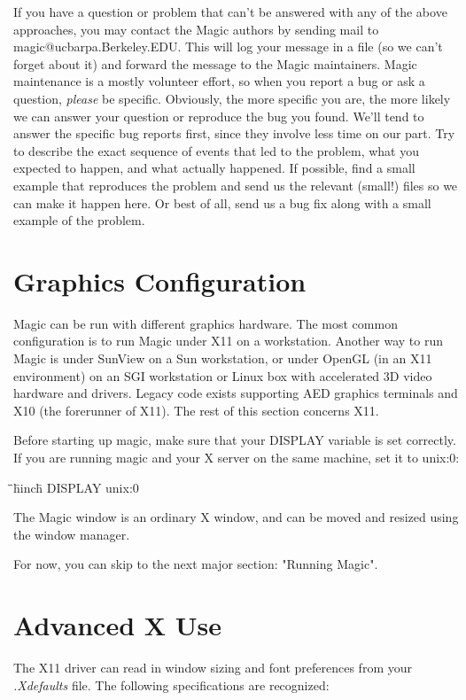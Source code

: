\documentclass[letterpaper,twoside,12pt]{article}
\def\hinch{\hspace*{0.5in}}
\def\starti{\begin{center}\begin{tabbing}\hinch\=\hinch\=\hinch\=hinch\hinch\=\kill}
\def\endi{\end{tabbing}\end{center}}
\def\ii{\>\>\>}
\begin{document}
If you have a question or problem that can't be answered
with any of the above approaches, you may contact the Magic authors 
by sending mail to {\ttfamily magic@ucbarpa.Berkeley.EDU}.
This will log your message in a file (so we can't forget about it) and
forward the message to the Magic maintainers.
Magic maintenance is a mostly volunteer effort, so
when you report a bug or ask a question, {\itshape please} be specific.  
Obviously, the more specific you are, the more likely we can answer your
question or reproduce the bug you found.
We'll tend to answer the specific bug reports first, since they involve less
time on our part.  Try to describe
the exact sequence of events that led to the problem, what you
expected to happen, and what actually happened.  If possible, 
find a small example that reproduces the problem and
send us the relevant (small!) files so we can make it happen here.
Or best of all, send us a bug fix along with a small example of the problem.

\section{Graphics Configuration}

Magic can be run with different graphics hardware.  The most common
configuration is to run Magic under X11 on a workstation.  Another way
to run Magic is under SunView on a Sun workstation, or under OpenGL
(in an X11 environment) on an SGI workstation or Linux box with
accelerated 3D video hardware and drivers.  Legacy code exists
supporting AED graphics terminals and X10 (the forerunner of X11).
The rest of this section concerns X11.  

Before starting up magic, make sure that your {\ttfamily DISPLAY} variable is
set correctly. If you are running magic and your X server on the same
machine, set it to {\ttfamily unix:0}:

\starti
  \ii {\bfseries setenv} {\ttfamily DISPLAY unix:0}
\endi

The Magic window is an ordinary X window, and can be moved and resized using
the window manager.

For now, you can skip to the next major section:  "Running Magic".

\section{Advanced X Use}

The X11 driver can read in window sizing and font preferences from 
your {\itshape .Xdefaults} file.  The following specifications are recognized:
\end{document}
